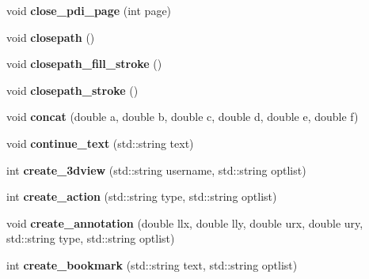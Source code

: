 \begin{DoxyCompactItemize}
\item 
\hypertarget{classPDFlib_abba8fa8b8ef399bcb6d57b40bd83a5ee}{void {\bfseries close\-\_\-pdi\-\_\-page} (int page)}\label{classPDFlib_abba8fa8b8ef399bcb6d57b40bd83a5ee}

\item 
\hypertarget{classPDFlib_a75f331c8e3dda754cfc4acd372366917}{void {\bfseries closepath} ()}\label{classPDFlib_a75f331c8e3dda754cfc4acd372366917}

\item 
\hypertarget{classPDFlib_a8d3d85a5f00e71fa3127cc42ac5245a1}{void {\bfseries closepath\-\_\-fill\-\_\-stroke} ()}\label{classPDFlib_a8d3d85a5f00e71fa3127cc42ac5245a1}

\item 
\hypertarget{classPDFlib_a926f4d493d0625eec0a5638a1318c661}{void {\bfseries closepath\-\_\-stroke} ()}\label{classPDFlib_a926f4d493d0625eec0a5638a1318c661}

\item 
\hypertarget{classPDFlib_aad54672cea67b8d25f68ae735cf1f4ca}{void {\bfseries concat} (double a, double b, double c, double d, double e, double f)}\label{classPDFlib_aad54672cea67b8d25f68ae735cf1f4ca}

\item 
\hypertarget{classPDFlib_a4ee3d13f4de6de4dd63f2430c2fb1ee2}{void {\bfseries continue\-\_\-text} (std\-::string text)}\label{classPDFlib_a4ee3d13f4de6de4dd63f2430c2fb1ee2}

\item 
\hypertarget{classPDFlib_ac3fb64cece3d7fbc0b5dd760e5ce490a}{int {\bfseries create\-\_\-3dview} (std\-::string username, std\-::string optlist)}\label{classPDFlib_ac3fb64cece3d7fbc0b5dd760e5ce490a}

\item 
\hypertarget{classPDFlib_abd882370ecf1a79ddf66c208817ab561}{int {\bfseries create\-\_\-action} (std\-::string type, std\-::string optlist)}\label{classPDFlib_abd882370ecf1a79ddf66c208817ab561}

\item 
\hypertarget{classPDFlib_af75e9080056e73d1aee1ad0277ac99eb}{void {\bfseries create\-\_\-annotation} (double llx, double lly, double urx, double ury, std\-::string type, std\-::string optlist)}\label{classPDFlib_af75e9080056e73d1aee1ad0277ac99eb}

\item 
\hypertarget{classPDFlib_a0ad6d073c261b0b69343fbc2aec77e61}{int {\bfseries create\-\_\-bookmark} (std\-::string text, std\-::string optlist)}\label{classPDFlib_a0ad6d073c261b0b69343fbc2aec77e61}


\end{DoxyCompactItemize}
